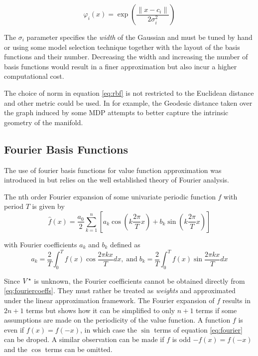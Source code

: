 \begin{equation}
\varphi_i(x) = \exp\left( \frac{\| x - c_i\|}{2\sigma_i^2}\right)
\label{eq:rbf}
\end{equation}

The $\sigma_i$ parameter specifies the \textit{width} of the Gaussian and must be
tuned by hand or using some model selection technique together with the
layout of the basis functions and their number. Decreasing the width and increasing the
number of basis functions would result in a finer approximation but also incur a higher
computational cost. 

The choice of norm in equation \ref{eq:rbf} is not restricted to the Euclidean distance
and other metric could be used. In \cite{Sugiyama2008} for example, the Geodesic
distance taken over the graph induced by some MDP attempts to better
capture the intrinsic geometry of the manifold.
 
\subsection{Fourier Basis Functions}

The use of fourier basis functions for value function approximation was introduced in
\cite{Konidaris2011b} but relies on the well established theory of Fourier analysis.

The nth order Fourier expansion of some univariate periodic function $f$ with period
$T$ is given by
\begin{equation}
\hat{f}(x) = \frac{a_0}{2} \sum_{k=1}^n \left[ a_k \cos\left(k\frac{2\pi}{T} x\right) +
b_k \sin \left(k \frac{2\pi}{T}x \right) \right]
\label{eq:fourier}
\end{equation}

with Fourier coefficients $a_k$ and $b_k$ defined as
\begin{equation}
a_k = \frac{2}{T} \int_0^T f(x) \cos \frac{2\pi kx}{T}dx, \; \mbox{and} \; b_k = \frac{2}
{T} \int_0^T f(x) \sin \frac{2\pi kx}{T}dx
\label{eq:fouriercoeffs}
\end{equation}

Since $V^\star$ is unknown, the Fourier coefficients cannot be obtained directly from \ref{eq:fouriercoeffs}. They must rather be treated as \textit{weights} and approximated under the linear approximation framework. The Fourier expansion of $f$ results in $2n+1$ terms but
\cite{Konidaris2011b} shows how it can be simplified to only $n+1$ terms if some
assumptions are made on the periodicity of the value function. A function $f$ is even if
$f(x) = f(-x)$, in which case the $\sin$ terms of equation \ref{eq:fourier} can be
droped. A similar observation can be made if $f$ is odd $-f(x) = f(-x)$ and the
$\cos$ terms can be omitted. 


